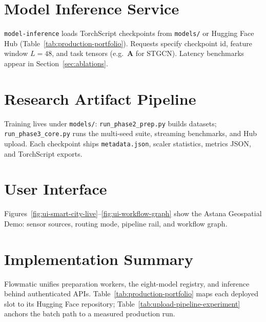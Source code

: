 \section{Model Inference Service}

\texttt{model-inference} loads TorchScript checkpoints from \texttt{models/} or Hugging Face Hub (Table~\ref{tab:production-portfolio}). Requests specify checkpoint id, feature window $L{=}48$, and task tensors (e.g.\ $\mathbf{A}$ for STGCN). Latency benchmarks appear in Section~\ref{sec:ablations}.

\section{Research Artifact Pipeline}

Training lives under \texttt{models/}: \texttt{run\_phase2\_prep.py} builds datasets; \texttt{run\_phase3\_core.py} runs the multi-seed suite, streaming benchmarks, and Hub upload. Each checkpoint ships \texttt{metadata.json}, scaler statistics, metrics JSON, and TorchScript exports.

\section{User Interface}

Figures~\ref{fig:ui-smart-city-live}--\ref{fig:ui-workflow-graph} show the Astana Geospatial Demo: sensor sources, routing mode, pipeline rail, and workflow graph.



\section{Implementation Summary}

Flowmatic unifies preparation workers, the eight-model registry, and inference behind authenticated APIs. Table~\ref{tab:production-portfolio} maps each deployed slot to its Hugging Face repository; Table~\ref{tab:upload-pipeline-experiment} anchors the batch path to a measured production run.


